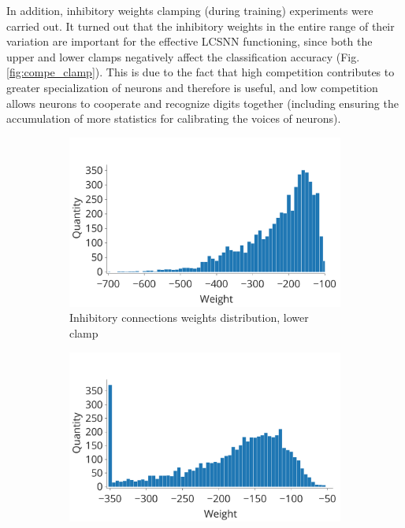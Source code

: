 \documentclass[a4paper]{article}
\begin{document}
In addition, inhibitory weights clamping (during training) experiments were carried out. It turned out that the inhibitory weights in the entire range of their variation are important for the effective LCSNN functioning, since both the upper and lower clamps negatively affect the classification accuracy (Fig. \ref{fig:compe_clamp}). This is due to the fact that high competition contributes to greater specialization of neurons and therefore is useful, and low competition allows neurons to cooperate and recognize digits together (including ensuring the accumulation of more statistics for calibrating the voices of neurons).

\begin{figure}
\centering 
\begin{subfigure}{0.45\textwidth}
    \includegraphics[width=\textwidth,keepaspectratio=true]{competition_distribution_clamp_low.pdf}
    \caption{Inhibitory connections weights distribution, lower clamp} 
\end{subfigure}
\begin{subfigure}{0.45\textwidth}
    \includegraphics[width=\textwidth,keepaspectratio=true]{competition_distribution_clamp_high.pdf}

\end{subfigure}
\end{figure}
\end{document}
